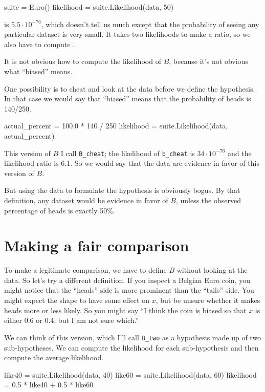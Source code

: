 \documentclass[12pt]{book}
\theoremstyle{exercise}
\begin{document}
\begin{code}
    suite = Euro()
    likelihood = suite.Likelihood(data, 50)
\end{code}

 is $5.5 \cdot 10^{-76}$, which doesn't tell us much except
that the probability of seeing any particular dataset is very small.
It takes two likelihoods to make a ratio, so we also have to
compute .

It is not obvious how to compute the likelihood of $B$, because
it's not obvious what ``biased'' means.

One possibility is to cheat and look at the data before we define
the hypothesis.  In that case we would say that ``biased'' means that
the probability of heads is 140/250.

\begin{code}
    actual_percent = 100.0 * 140 / 250
    likelihood = suite.Likelihood(data, actual_percent)
\end{code}

This version of $B$ I call \verb"B_cheat"; the likelihood of
\verb"b_cheat" is $34 \cdot 10^{-76}$ and the likelihood ratio is
6.1.  So we would say that the data are evidence in favor of this
version of $B$.

But using the data to formulate the hypothesis
is obviously bogus.  By that definition, any dataset would
be evidence in favor of $B$, unless the observed percentage of heads
is exactly 50\%.

\section{Making a fair comparison}
\label{suitelike}

To make a legitimate comparison, we have to define $B$ without looking
at the data.  So let's try a different definition.  If you inspect
a Belgian Euro coin, you might notice that the ``heads'' side is more
prominent than the ``tails'' side.  You might expect the shape to 
have some effect on
$x$, but be unsure whether it makes heads more or less
likely.  So you might say ``I think the coin is biased so that
$x$ is either 0.6 or 0.4, but I am not sure which.''

We can think of this version, which I'll call \verb"B_two"
as a hypothesis made up of two
sub-hypotheses.  We can compute the likelihood for each
sub-hypothesis and then compute the average likelihood.

\begin{code}
    like40 = suite.Likelihood(data, 40)
    like60 = suite.Likelihood(data, 60)
    likelihood = 0.5 * like40 + 0.5 * like60
\end{code}
\end{document}
